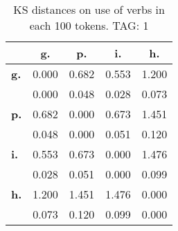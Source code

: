 \begin{table}[h!]
\begin{center}
\begin{tabular}{| l || c | c | c | c |}\hline
 & {\bf g.} & {\bf p.} & {\bf i.} & {\bf h.} \\\hline\hline
{\bf g.} & 0.000 & 0.682 & 0.553 & 1.200 \\
{\bf } & 0.000 & 0.048 & 0.028 & 0.073 \\\hline
{\bf p.} & 0.682 & 0.000 & 0.673 & 1.451 \\
{\bf } & 0.048 & 0.000 & 0.051 & 0.120 \\\hline
{\bf i.} & 0.553 & 0.673 & 0.000 & 1.476 \\
{\bf } & 0.028 & 0.051 & 0.000 & 0.099 \\\hline
{\bf h.} & 1.200 & 1.451 & 1.476 & 0.000 \\
{\bf } & 0.073 & 0.120 & 0.099 & 0.000 \\\hline
\end{tabular}
\caption{KS distances on use of verbs in each 100 tokens. TAG: 1}
\end{center}
\end{table}
